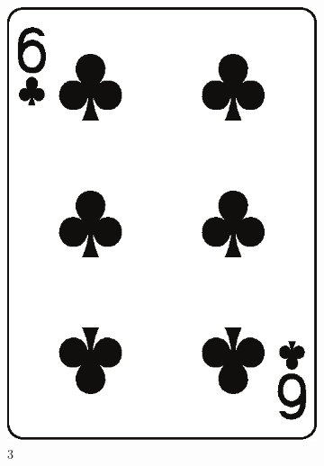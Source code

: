 \documentclass[10pt]{beamer}
\begin{document}
\begin{frame}
\begin{columns}
\begin{column}{7cm}
\begin{figure}
\begin{subfigure}{.15\linewidth}
      \includegraphics[width=\linewidth]{im/clubs_6.eps}
      \caption{3}
     \end{subfigure}
     \begin{subfigure}{.15\linewidth}

\end{subfigure}
\end{figure}
\end{column}
\end{columns}
\end{frame}
\end{document}

